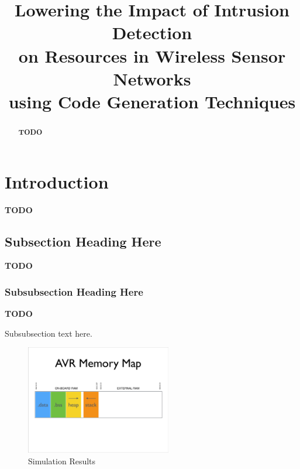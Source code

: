 \documentclass[conference]{IEEEtran}
\newcommand{\TODO}{\textbf{\color{red}TODO}}
\begin{document}
\title{Lowering the Impact of Intrusion Detection\\
on Resources in Wireless Sensor Networks\\
using Code Generation Techniques}

\author{%
}

\maketitle

\begin{abstract}
\TODO
\end{abstract}

\section{Introduction}

\TODO

\subsection{Subsection Heading Here}

\TODO


\subsubsection{Subsubsection Heading Here}

\TODO

Subsubsection text here.

\begin{figure}[!t]
\centering
\includegraphics[width=2.5in]{resources/avr-ram-map.pdf}
\caption{Simulation Results}
\label{fig_sim1}
\end{figure}
\end{document}
